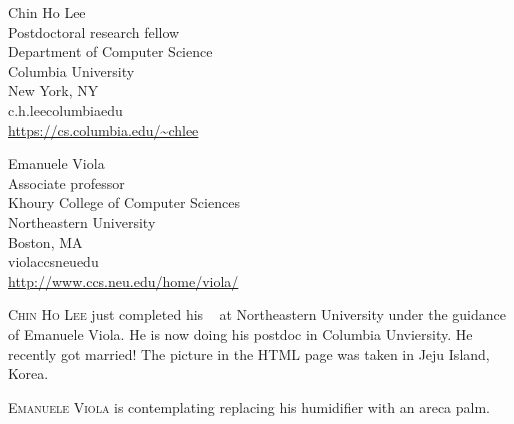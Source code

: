 \documentclass{toc}
\begin{document}
%
%
%
%
%
\begin{tocauthors}
\begin{tocinfo}[lee]
 Chin Ho Lee\\
 Postdoctoral research fellow\\
 Department of Computer Science\\
 Columbia University\\
 New York, NY\\
 c.h.lee\tocat{}columbia\tocdot{}edu \\   %
 \url{https://cs.columbia.edu/~chlee}      %
\end{tocinfo}
\begin{tocinfo}[viola]
  Emanuele Viola\\
  Associate professor\\
  Khoury College of Computer Sciences\\
  Northeastern University\\
  Boston, MA\\
  viola\tocat{}ccs\tocdot{}neu\tocdot{}edu \\
  \url{http://www.ccs.neu.edu/home/viola/}
\end{tocinfo}
\end{tocauthors}

%
%
%
%
%
%
%
%
%
%
%
%
%
%
\begin{tocaboutauthors}
\begin{tocabout}[lee]  %
  \textsc{Chin Ho Lee} just completed his \phd\
%
at   %
Northeastern University under the guidance of Emanuele Viola.
He is now doing his postdoc in Columbia Unviersity.  He recently
got married!  The picture
in the HTML page  %
%
was taken in Jeju Island, Korea.
\end{tocabout}
\begin{tocabout}[viola]
\textsc{Emanuele Viola} is contemplating replacing his humidifier 
with an areca palm.
\end{tocabout}
\end{tocaboutauthors}
\end{document}
